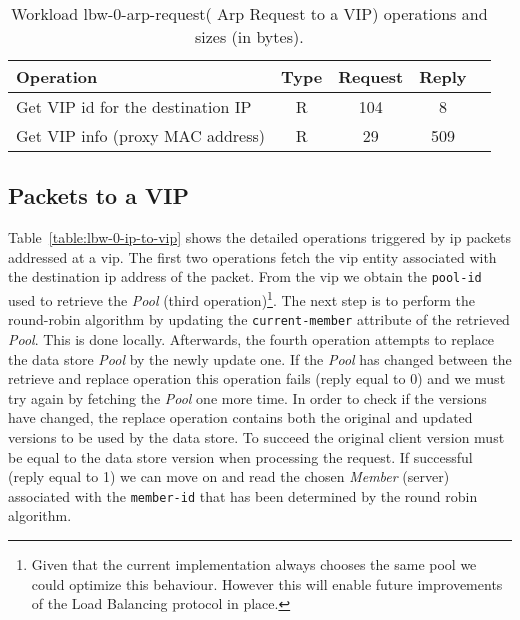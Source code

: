 \documentclass[12pt,openright,twoside]{report}
\begin{document}
\begin{table}[ht]
\small
\centering 
\begin{tabular}{l c c c c}
Operation & Type & Request & Reply \\ \toprule 
Get VIP id for the destination IP  & R & 104 & 8\\
Get VIP info (proxy MAC address) & R & 29 & 509 \\\bottomrule
\end{tabular}\caption[Workload lbw-0-arp-request( Arp Request to a
VIP) operations]{Workload lbw-0-arp-request( Arp Request to a VIP)
 operations and sizes (in bytes).}
\label{table:lbw-0-arp-request}
\end{table}


\subsection{Packets to a VIP}
Table~\ref{table:lbw-0-ip-to-vip} shows the detailed operations triggered by \gls{ip}  packets addressed at a \gls{vip}. 
The first two operations fetch the \gls{vip} entity associated with the destination \gls{ip} address of the packet. 
From the \gls{vip} we obtain the \texttt{pool-id} used to retrieve the \emph{Pool} (third operation)\footnote{Given that the current implementation always chooses the same  pool we could optimize this behaviour. However this will enable future improvements of the Load Balancing protocol in place.}. 
The next step is to perform the round-robin algorithm by updating the \texttt{current-member} attribute of the retrieved \emph{Pool}. 
This is done locally. 
Afterwards, the fourth operation attempts to replace the data store \emph{Pool} by the newly update one. 
If the \emph{Pool} has changed between the retrieve and replace operation this operation fails (reply equal to 0) and we must try again by fetching the \emph{Pool} one more time. In order to check if the versions have changed, the replace operation contains both the original and updated versions to be used by the data store. 
To succeed the original client version must be equal to the data store version when processing the request.
If successful (reply equal to 1) we can move on and read the chosen \emph{Member} (server) associated with the \texttt{member-id}  that has been determined by the round robin algorithm. 
\end{document}
